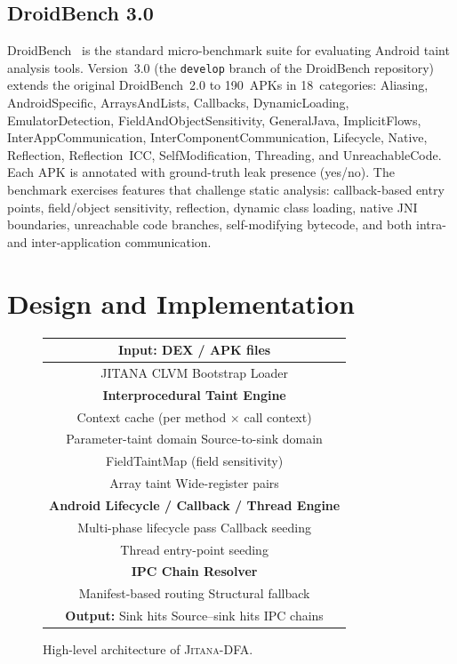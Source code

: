 \documentclass[conference]{IEEEtran}
\begin{document}
\subsection{DroidBench 3.0}

DroidBench~\cite{droidbench} is the standard micro-benchmark suite for
evaluating Android taint analysis tools. Version~3.0 (the \texttt{develop}
branch of the DroidBench repository) extends the original DroidBench~2.0 to
190~APKs in 18~categories: Aliasing, AndroidSpecific, ArraysAndLists, Callbacks,
DynamicLoading, EmulatorDetection, FieldAndObjectSensitivity, GeneralJava,
ImplicitFlows, InterAppCommunication, InterComponentCommunication, Lifecycle,
Native, Reflection, Reflection~ICC, SelfModification, Threading, and
UnreachableCode. Each APK is annotated with ground-truth leak presence (yes/no).
The benchmark exercises features that challenge static analysis: callback-based
entry points, field/object sensitivity, reflection, dynamic class loading, native
JNI boundaries, unreachable code branches, self-modifying bytecode, and both
intra- and inter-application communication.

\section{Design and Implementation}

\begin{figure}[t]
\centering
\small
\begin{tabular}{|c|}
\hline
\textbf{Input:} DEX / APK files \\
\hline
JITANA CLVM \quad Bootstrap Loader \\
\hline
\textbf{Interprocedural Taint Engine} \\
Context cache (per method $\times$ call context) \\
Parameter-taint domain \quad Source-to-sink domain \\
FieldTaintMap (field sensitivity) \\
Array taint \quad Wide-register pairs \\
\hline
\textbf{Android Lifecycle / Callback / Thread Engine} \\
Multi-phase lifecycle pass \quad Callback seeding \\
Thread entry-point seeding \\
\hline
\textbf{IPC Chain Resolver} \\
Manifest-based routing \quad Structural fallback \\
\hline
\textbf{Output:} Sink hits \quad Source--sink hits \quad IPC chains \\
\hline
\end{tabular}
\caption{High-level architecture of \textsc{Jitana-DFA}.}
\label{fig:arch}
\end{figure}
\end{document}

